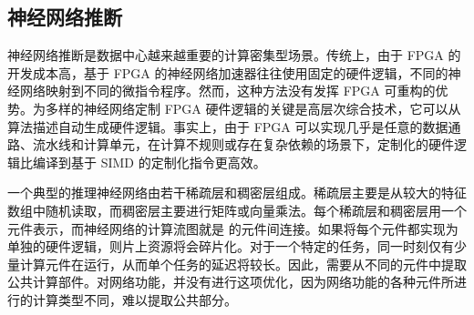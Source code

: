 \subsection{神经网络推断}

神经网络推断是数据中心越来越重要的计算密集型场景。传统上，由于 FPGA 的开发成本高，基于 FPGA 的神经网络加速器往往使用固定的硬件逻辑，不同的神经网络映射到不同的微指令程序。然而，这种方法没有发挥 FPGA 可重构的优势。为多样的神经网络定制 FPGA 硬件逻辑的关键是高层次综合技术，它可以从算法描述自动生成硬件逻辑。事实上，由于 FPGA 可以实现几乎是任意的数据通路、流水线和计算单元，在计算不规则或存在复杂依赖的场景下，定制化的硬件逻辑比编译到基于 SIMD 的定制化指令更高效。

一个典型的推理神经网络由若干稀疏层和稠密层组成。稀疏层主要是从较大的特征数组中随机读取，而稠密层主要进行矩阵或向量乘法。每个稀疏层和稠密层用一个 \name 元件表示，而神经网络的计算流图就是 \name 的元件间连接。如果将每个元件都实现为单独的硬件逻辑，则片上资源将会碎片化。对于一个特定的任务，同一时刻仅有少量计算元件在运行，从而单个任务的延迟将较长。因此，需要从不同的元件中提取公共计算部件。对网络功能，\name 并没有进行这项优化，因为网络功能的各种元件所进行的计算类型不同，难以提取公共部分。

